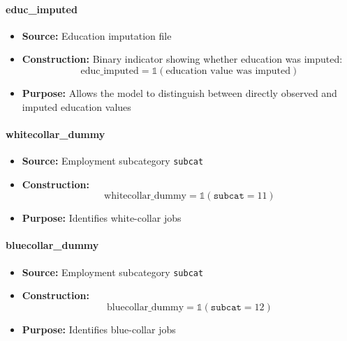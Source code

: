 \documentclass{article}
\begin{document}
\paragraph{educ\_imputed}
\begin{itemize}
    \item \textbf{Source:} Education imputation file
    \item \textbf{Construction:} Binary indicator showing whether education was imputed:
    \begin{equation}
        \text{educ\_imputed} = \mathbb{1}(\text{education value was imputed})
    \end{equation}
    \item \textbf{Purpose:} Allows the model to distinguish between directly observed and imputed education values
\end{itemize}

\paragraph{whitecollar\_dummy}
\begin{itemize}
    \item \textbf{Source:} Employment subcategory \texttt{subcat}
    \item \textbf{Construction:}
    \begin{equation}
        \text{whitecollar\_dummy} = \mathbb{1}(\texttt{subcat}=11)
    \end{equation}
    \item \textbf{Purpose:} Identifies white-collar jobs
\end{itemize}

\paragraph{bluecollar\_dummy}
\begin{itemize}
    \item \textbf{Source:} Employment subcategory \texttt{subcat}
    \item \textbf{Construction:}
    \begin{equation}
        \text{bluecollar\_dummy} = \mathbb{1}(\texttt{subcat}=12)
    \end{equation}
    \item \textbf{Purpose:} Identifies blue-collar jobs
\end{itemize}
\end{document}
